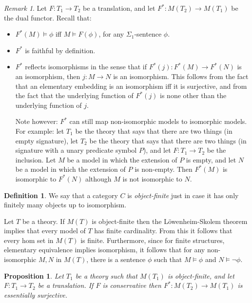 \documentclass[12pt]{article}
\newtheorem{prop}{Proposition}
\theoremstyle{definition}
\newtheorem*{defn}{Definition}
\theoremstyle{remark}
\newtheorem*{note}{Remark}
\newcommand{\3}{\mathcal}
\begin{document}
\begin{note} Let $F:T_1\to T_2$ be a translation, and let
  $F^*:M(T_2)\to M(T_1)$ be the dual functor. Recall that:
  \begin{itemize}
  \item $F^*(M)\vDash \phi$ iff $M\vDash F(\phi )$, for any
    $\Sigma _1$-sentence $\phi$.
    \item $F^*$ is faithful by definition.
    \item $F^*$ reflects isomorphisms in the sense that if
      $F^*(j):F^*(M)\to F^*(N)$ is an isomorphism, then $j:M\to N$ is
      an isomorphism. This follows from the fact that an elementary
      embedding is an isomorphism iff it is surjective, and from the
      fact that the underlying function of $F^*(j)$ is none other than
      the underlying function of $j$.

      Note however: $F^*$ can still map non-isomorphic models to
      isomorphic models. For example: let $T_1$ be the theory that
      says that there are two things (in empty signature), let $T_2$
      be the theory that says that there are two things (in signature
      with a unary predicate symbol $P$), and let $F:T_1\to T_2$ be
      the inclusion. Let $M$ be a model in which the extension of $P$
      is empty, and let $N$ be a model in which the extension of $P$
      is non-empty. Then $F^*(M)$ is isomorphic to $F^*(N)$ although
      $M$ is not isomorphic to $N$.
    \end{itemize} \end{note}

\begin{defn} We say that a category $C$ is \emph{object-finite} just
  in case it has only finitely many objects up to
  isomorphism. \end{defn}

Let $T$ be a theory. If $M(T)$ is object-finite then the
L{\"o}wenheim-Skolem theorem implies that every model of $T$ has
finite cardinality. From this it follows that every hom set in $M(T)$
is finite. Furthermore, since for finite structures, elementary
equivalence implies isomorphism, it follows that for any
non-isomorphic $M,N$ in $M(T)$, there is a sentence $\phi$ such that
$M\vDash\phi$ and $N\vDash\neg\phi$.

\begin{prop} Let $T_1$ be a theory such that $M(T_1)$ is
  object-finite, and let $F:T_1\to T_2$ be a translation. If $F$ is
  conservative then $F^*:M(T_2)\to M(T_1)$ is essentially
  surjective. \end{prop}
\end{document}
